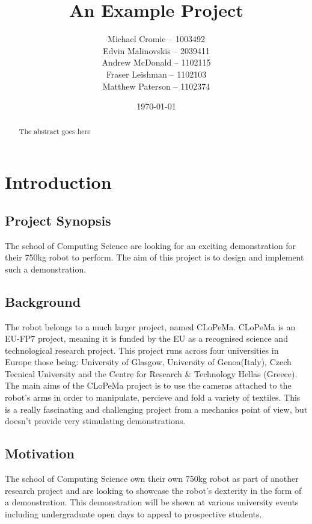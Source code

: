 \documentclass{l3proj}
\begin{document}
\title{An Example Project}
\author{Michael Cromie -- 1003492\\
        Edvin Malinovskis -- 2039411 \\
        Andrew McDonald -- 1102115  \\
        Fraser Leishman -- 1102103 \\
        Matthew Paterson -- 1102374 \\
        }
\date{\today}
\maketitle
\begin{abstract}

The abstract goes here

\end{abstract}
\educationalconsent
\tableofcontents
\chapter{Introduction}
\label{intro}
\section{Project Synopsis}
The school of Computing Science are looking for an exciting demonstration for their 750kg robot to perform. The aim of this project is to design and implement such a demonstration.
\section{Background}
The robot belongs to a much larger project, named CLoPeMa. CLoPeMa is an EU-FP7 project, meaning it is funded by the EU as a recognised science and technological research project. This project runs across four universities in Europe those being: University of Glasgow, University of Genoa(Italy), Czech Tecnical University and the Centre for Research \& Technology Hellas (Greece). 
The main aims of the CLoPeMa project is to use the cameras attached to the robot's arms in order to manipulate, percieve and fold a variety of textiles. This is a really fascinating and challenging project from a mechanics point of view, but doesn't provide very stimulating demonstrations.
\section{Motivation}
The school of Computing Science own their own 750kg robot as part of another research project and are looking to showcase the robot's dexterity in the form of a demonstration. This demonstration will be shown at various university events including undergraduate open days to appeal to prospective students.
\end{document}
